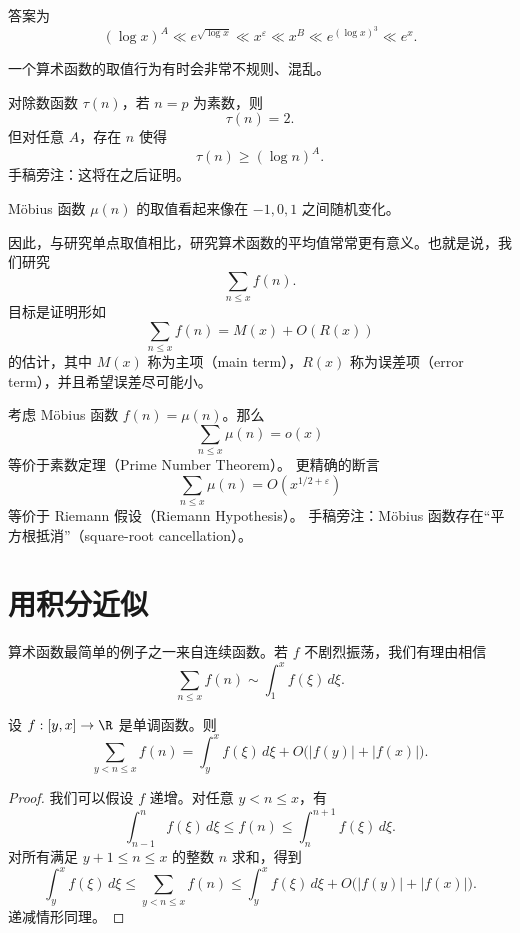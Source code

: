 答案为
\[
	(\log x)^A
	\ll
	e^{\sqrt{\log x}}
	\ll
	x^\varepsilon
	\ll
	x^B
	\ll
	e^{(\log x)^3}
	\ll
	e^x.
\]

\begin{remark}
	一个算术函数的取值行为有时会非常不规则、混乱。
\end{remark}

\begin{example}
	对除数函数 $\tau(n)$，若 $n=p$ 为素数，则
	\[
		\tau(n)=2.
	\]
	但对任意 $A$，存在 $n$ 使得
	\[
		\tau(n)\geq (\log n)^A.
	\]
	手稿旁注：这将在之后证明。
\end{example}

\begin{example}
	Möbius 函数 $\mu(n)$ 的取值看起来像在 $-1,0,1$ 之间随机变化。
\end{example}

因此，与研究单点取值相比，研究算术函数的平均值常常更有意义。也就是说，我们研究
\[
	\sum_{n\leq x}f(n).
\]
目标是证明形如
\[
	\sum_{n\leq x}f(n)=M(x)+O(R(x))
\]
的估计，其中 $M(x)$ 称为主项（main term），$R(x)$ 称为误差项（error term），并且希望误差尽可能小。

\begin{example}
	考虑 Möbius 函数 $f(n)=\mu(n)$。那么
	\[
		\sum_{n\leq x}\mu(n)=o(x)
	\]
	等价于素数定理（Prime Number Theorem）。
	更精确的断言
	\[
		\sum_{n\leq x}\mu(n)=O(x^{1/2+\varepsilon})
	\]
	等价于 Riemann 假设（Riemann Hypothesis）。
	手稿旁注：Möbius 函数存在“平方根抵消”（square-root cancellation）。
\end{example}

\section{用积分近似}


算术函数最简单的例子之一来自连续函数。若 $f$ 不剧烈振荡，我们有理由相信
\[
	\sum_{n\leq x}f(n)\sim \int_1^x f(\xi)\,d\xi.
\]

\begin{theorem}
	设 $f:[y,x]\to\R$ 是单调函数。则
	\[
		\sum_{y<n\leq x} f(n)
		=
		\int_y^x f(\xi)\,d\xi
		+
		O\bigl(|f(y)|+|f(x)|\bigr).
	\]
\end{theorem}

\begin{proof}
	我们可以假设 $f$ 递增。对任意 $y<n\leq x$，有
	\[
		\int_{n-1}^{n} f(\xi)\,d\xi
		\leq
		f(n)
		\leq
		\int_{n}^{n+1} f(\xi)\,d\xi.
	\]
	对所有满足 $y+1\leq n\leq x$ 的整数 $n$ 求和，得到
	\[
		\int_y^x f(\xi)\,d\xi
		\leq
		\sum_{y<n\leq x} f(n)
		\leq
		\int_y^x f(\xi)\,d\xi+O\bigl(|f(y)|+|f(x)|\bigr).
	\]
	递减情形同理。
\end{proof}

